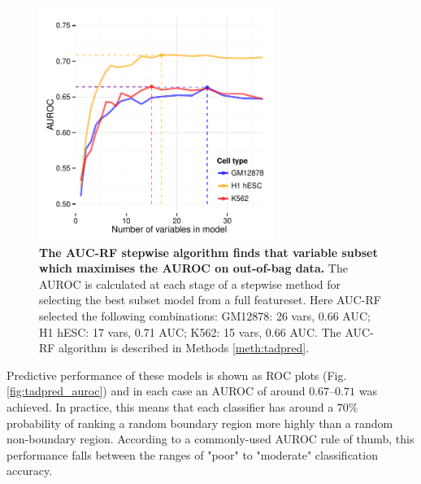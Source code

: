 \documentclass[a4paper,11pt,oneside]{book}
\begin{document}
\begin{figure}
\begin{center} 
\includegraphics[width=3in]{AUCRF_opt.pdf}
\captionsetup{width=\textwidth}
\caption[ The AUC-RF stepwise algorithm finds that variable subset which maximises the AUROC on out-of-bag data. ]{ {\bf The AUC-RF stepwise algorithm finds that variable subset which maximises the AUROC on out-of-bag data. }
The AUROC is calculated at each stage of a stepwise method for selecting the best subset model from a full featureset. Here AUC-RF selected the following combinations: GM12878: 26 vars, 0.66 AUC; H1 hESC: 17 vars, 0.71 AUC; K562: 15 vars, 0.66 AUC. The AUC-RF algorithm is described in Methods \ref{meth:tadpred}.
}\label{fig:tadpred_opt}
\end{center}
\end{figure} 


Predictive performance of these models is shown as ROC plots (Fig. \ref{fig:tadpred_auroc}) and in each case an AUROC of around $0.67$--$0.71$ was achieved. In practice, this means that each classifier has around a $70\%$ probability of ranking a random boundary region more highly than a random non-boundary region.\cite{Fawcett2006a} According to a commonly-used AUROC rule of thumb, this performance falls between the ranges of "poor" to "moderate" classification accuracy.\cite{Streiner2007a}
\end{document}

